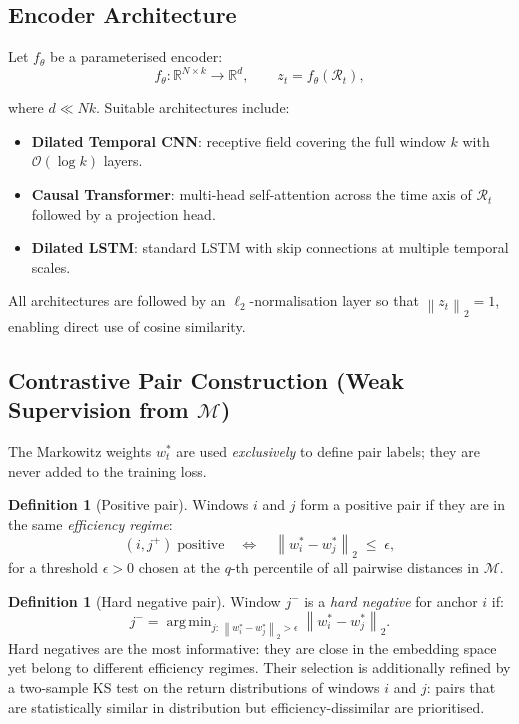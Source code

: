 \documentclass[12pt, a4paper]{report}
\theoremstyle{plain}
\theoremstyle{definition}
\newtheorem{definition}[theorem]{Definition}
\newcommand{\R}{\mathbb{R}}
\newcommand{\calM}{\mathcal{M}}
\newcommand{\calR}{\mathcal{R}}
\newcommand{\norm}[1]{\left\|#1\right\|}
\DeclareMathOperator*{\argmin}{arg\,min}
\begin{document}
\subsection{Encoder Architecture}
\label{subsec:encoder}

Let $f_\theta$ be a parameterised encoder:
\begin{equation}
  f_\theta : \R^{N \times k} \to \R^d, \qquad z_t = f_\theta(\calR_t),
  \label{eq:encoder}
\end{equation}

where $d \ll Nk$.  Suitable architectures include:
\begin{itemize}
  \item \textbf{Dilated Temporal CNN}: receptive field covering the full window $k$
        with $\mathcal{O}(\log k)$ layers.
  \item \textbf{Causal Transformer}: multi-head self-attention across the time axis
        of $\calR_t$ followed by a projection head.
  \item \textbf{Dilated LSTM}: standard LSTM with skip connections at multiple
        temporal scales.
\end{itemize}

All architectures are followed by an $\ell_2$-normalisation layer so that
$\norm{z_t}_2 = 1$, enabling direct use of cosine similarity.

\subsection{Contrastive Pair Construction (Weak Supervision from \texorpdfstring{$\calM$}{M})}
\label{subsec:pairs}

The Markowitz weights $w_t^*$ are used \emph{exclusively} to define pair labels;
they are never added to the training loss.

\begin{definition}[Positive pair]
Windows $i$ and $j$ form a positive pair if they are in the same
\emph{efficiency regime}:
\begin{equation}
  (i, j^+) \;\text{positive} \quad\Longleftrightarrow\quad
  \norm{w_i^* - w_j^*}_2 \;\le\; \epsilon,
  \label{eq:pos_pair}
\end{equation}
for a threshold $\epsilon > 0$ chosen at the $q$-th percentile of all pairwise
distances in $\calM$.
\end{definition}

\begin{definition}[Hard negative pair]
Window $j^-$ is a \emph{hard negative} for anchor $i$ if:
\[
  j^- = \argmin_{j:\,\norm{w_i^*-w_j^*}_2 > \epsilon}
        \norm{w_i^* - w_j^*}_2.
\]
Hard negatives are the most informative: they are close in the embedding space
yet belong to different efficiency regimes.  Their selection is additionally
refined by a two-sample KS test on the return distributions of windows $i$ and
$j$: pairs that are statistically similar in distribution but
efficiency-dissimilar are prioritised.
\end{definition}
\end{document}
